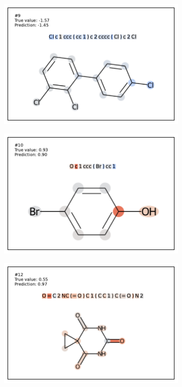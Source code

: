 \begin{figure}
\begin{subfigure}[b]{0.33\textwidth}
\end{subfigure}
\begin{subfigure}[b]{0.33\textwidth} 
  \centering 
  \includegraphics[width=\textwidth]{figures/esol/esol9.pdf} 
\end{subfigure}\begin{subfigure}[b]{0.33\textwidth} 
  \centering 
  \includegraphics[width=\textwidth]{figures/esol/esol10.pdf} 
\end{subfigure}\begin{subfigure}[b]{0.33\textwidth} 
  \centering 
  \includegraphics[width=\textwidth]{figures/esol/esol12.pdf} 

\end{subfigure}
\end{figure}
